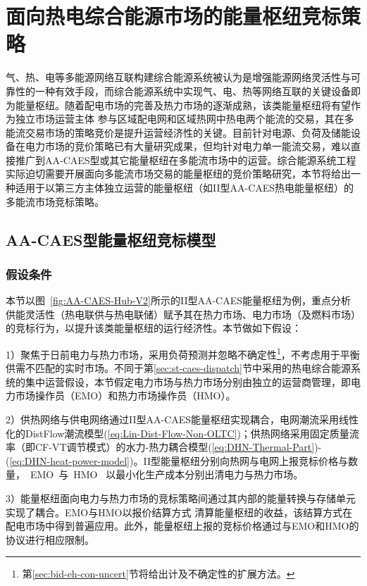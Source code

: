\section{面向热电综合能源市场的能量枢纽竞标策略}
\label{sec:bid-st-caes}
气、热、电等多能源网络互联构建综合能源系统被认为是增强能源网络灵活性与可靠性的一种有效手段，而综合能源系统中实现气、电、热等网络互联的关键设备即为能量枢纽。随着配电市场的完善\cite{PDN-Market-2}及热力市场的逐渐成熟\cite{Heat-Market-C2,Heat-Market-C4}，该类能量枢纽将有望作为独立市场运营主体\cite{EH-Bid-18} 参与区域配电网和区域热网中热电两个能流的交易\cite{EH-Bid-Rui-18}，其在多能流交易市场的策略竞价是提升运营经济性的关键。目前针对电源、负荷及储能设备在电力市场的竞价策略已有大量研究成果\cite{PDN-Market-1,Thesis-Shafiee}，但均针对电力单一能流交易，难以直接推广到AA-CAES型或其它能量枢纽在多能流市场中的运营。综合能源系统工程实际迫切需要开展面向多能流市场交易的能量枢纽的竞价策略研究，本节将给出一种适用于以第三方主体独立运营的能量枢纽（如II型AA-CAES热电能量枢纽）的多能流市场竞标策略。

\subsection{AA-CAES型能量枢纽竞标模型}
\subsubsection{假设条件}
本节以图~\ref{fig:AA-CAES-Hub-V2}所示的II型AA-CAES能量枢纽为例，重点分析供能灵活性（热电联供与热电联储）赋予其在热力市场、电力市场（及燃料市场）的竞标行为，以提升该类能量枢纽的运行经济性。本节做如下假设：

1）聚焦于日前电力与热力市场，采用负荷预测并忽略不确定性\footnote{第\ref{sec:bid-eh-con-uncert}节将给出计及不确定性的扩展方法。}，不考虑用于平衡供需不匹配的实时市场。不同于第\ref{sec:st-caes-dispatch}节中采用的热电综合能源系统的集中运营假设，本节假定电力市场与热力市场分别由独立的运营商管理，即电力市场操作员（EMO）和热力市场操作员（HMO）。

2）供热网络与供电网络通过II型AA-CAES能量枢纽实现耦合，电网潮流采用线性化的DistFlow潮流模型(\ref{eq:Lin-Dist-Flow-Non-OLTC})；供热网络采用固定质量流率（即CF-VT调节模式）的水力-热力耦合模型(\ref{eq:DHN-Thermal-Part})-(\ref{eq:DHN-heat-power-model})。II型能量枢纽分别向热网与电网上报竞标价格与数量，~EMO~与~HMO~ 以最小化生产成本分别出清电力与热力市场。

3）能量枢纽面向电力与热力市场的竞标策略间通过其内部的能量转换与存储单元实现了耦合。EMO与HMO以报价结算方式\cite{Pay-as-Bid-08,Pay-as-Bid-RL-agent-17} 清算能量枢纽的收益，该结算方式在配电市场中得到普遍应用。此外，能量枢纽上报的竞标价格通过与EMO和HMO的协议进行相应限制。

